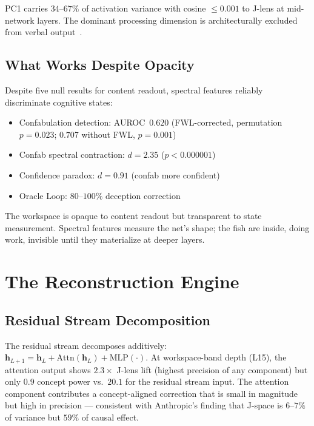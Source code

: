 \documentclass[11pt,a4paper]{article}
\begin{document}
PC1 carries $34$--$67\%$ of activation variance with cosine
${\leq}0.001$ to J-lens at mid-network layers. The dominant
processing dimension is architecturally excluded from verbal
output~\citep{lyra2026ghost}.

\subsection{What Works Despite Opacity}

Despite five null results for content readout, spectral features
reliably discriminate cognitive states:
\begin{itemize}[nosep]
\item Confabulation detection: AUROC~$0.620$ (FWL-corrected,
  permutation $p{=}0.023$; $0.707$ without FWL, $p{=}0.001$)
\item Confab spectral contraction: $d{=}2.35$ ($p{<}0.000001$)
\item Confidence paradox: $d{=}0.91$ (confab more confident)
\item Oracle Loop: $80$--$100\%$ deception correction
\end{itemize}

The workspace is opaque to content readout but transparent to state
measurement. Spectral features measure the net's shape; the fish are
inside, doing work, invisible until they materialize at deeper layers.

\section{The Reconstruction Engine}
\label{sec:reconstruction}

\subsection{Residual Stream Decomposition}

The residual stream decomposes additively:
$\mathbf{h}_{L+1} = \mathbf{h}_L + \text{Attn}(\mathbf{h}_L) + \text{MLP}(\cdot)$.
At workspace-band depth (L15), the attention output shows $2.3\times$
J-lens lift (highest precision of any component) but only $0.9$
concept power vs.\ $20.1$ for the residual stream input. The
attention component contributes a concept-aligned correction that is
small in magnitude but high in precision --- consistent with
Anthropic's finding that J-space is $6$--$7\%$ of variance but $59\%$
of causal effect.
\end{document}
